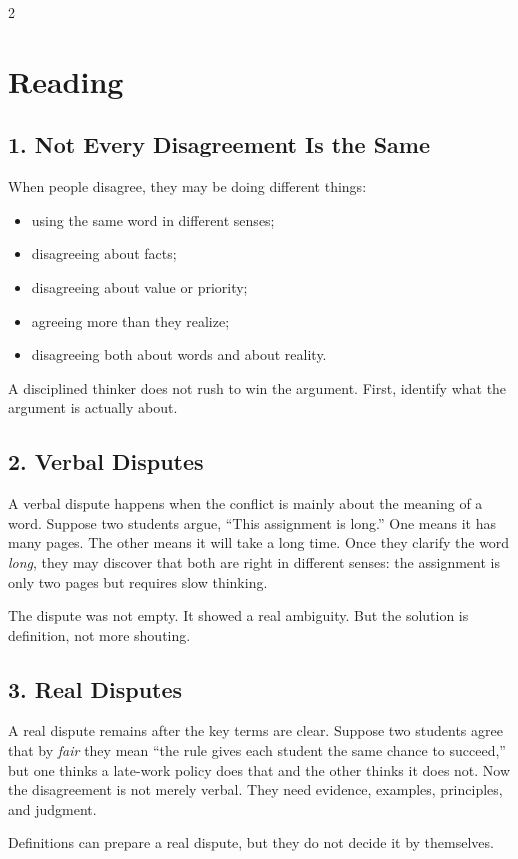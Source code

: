 \documentclass[12pt]{article}
\begin{document}
\begin{multicols}{2}
\section*{Reading}

\subsection*{1. Not Every Disagreement Is the Same}
When people disagree, they may be doing different things:
\begin{itemize}[leftmargin=*]
\item using the same word in different senses;
\item disagreeing about facts;
\item disagreeing about value or priority;
\item agreeing more than they realize;
\item disagreeing both about words and about reality.
\end{itemize}
A disciplined thinker does not rush to win the argument. First, identify what the argument is actually about.

\subsection*{2. Verbal Disputes}
A verbal dispute happens when the conflict is mainly about the meaning of a word. Suppose two students argue, ``This assignment is long.'' One means it has many pages. The other means it will take a long time. Once they clarify the word \textit{long}, they may discover that both are right in different senses: the assignment is only two pages but requires slow thinking.

The dispute was not empty. It showed a real ambiguity. But the solution is definition, not more shouting.

\subsection*{3. Real Disputes}
A real dispute remains after the key terms are clear. Suppose two students agree that by \textit{fair} they mean ``the rule gives each student the same chance to succeed,'' but one thinks a late-work policy does that and the other thinks it does not. Now the disagreement is not merely verbal. They need evidence, examples, principles, and judgment.

Definitions can prepare a real dispute, but they do not decide it by themselves.


\end{multicols}
\end{document}
